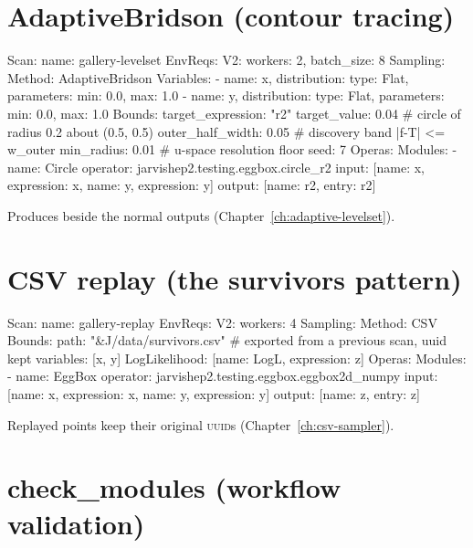 \section{AdaptiveBridson (contour tracing)}

\begin{yamlwin}
Scan: {name: gallery-levelset}
EnvReqs:
  V2: {workers: 2, batch_size: 8}
Sampling:
  Method: AdaptiveBridson
  Variables:
    - {name: x, distribution: {type: Flat, parameters: {min: 0.0, max: 1.0}}}
    - {name: y, distribution: {type: Flat, parameters: {min: 0.0, max: 1.0}}}
  Bounds:
    target_expression: "r2"
    target_value: 0.04            # circle of radius 0.2 about (0.5, 0.5)
    outer_half_width: 0.05        # discovery band |f-T| <= w_outer
    min_radius: 0.01              # u-space resolution floor
    seed: 7
Operas:
  Modules:
    - name: Circle
      operator: jarvishep2.testing.eggbox.circle_r2
      input:  [{name: x, expression: x}, {name: y, expression: y}]
      output: [{name: r2, entry: r2}]
\end{yamlwin}

Produces  beside the normal outputs
(Chapter~\ref{ch:adaptive-levelset}).

\section{CSV replay (the survivors pattern)}

\begin{yamlwin}
Scan: {name: gallery-replay}
EnvReqs:
  V2: {workers: 4}
Sampling:
  Method: CSV
  Bounds:
    path: "&J/data/survivors.csv"   # exported from a previous scan, uuid kept
    variables: [x, y]
  LogLikelihood: [{name: LogL, expression: z}]
Operas:
  Modules:
    - name: EggBox
      operator: jarvishep2.testing.eggbox.eggbox2d_numpy
      input:  [{name: x, expression: x}, {name: y, expression: y}]
      output: [{name: z, entry: z}]
\end{yamlwin}

Replayed points keep their original \textsc{uuid}s
(Chapter~\ref{ch:csv-sampler}).

\section{check\_modules (workflow validation)}

